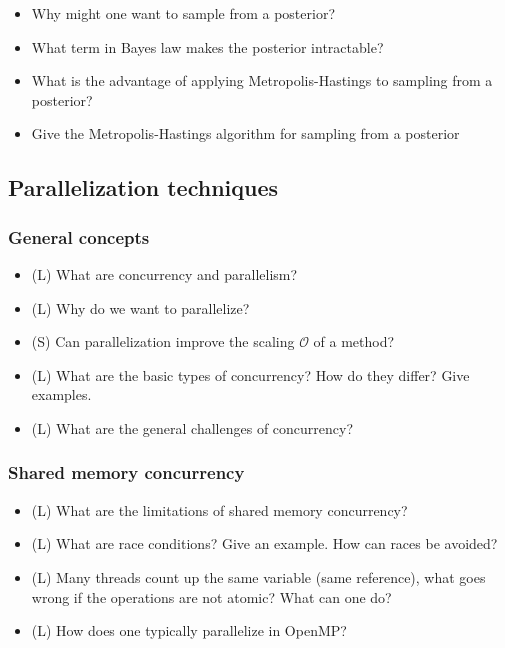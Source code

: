 \begin{itemize}
    \item Why might one want to sample from a posterior?
    \answerboxM
    \item What term in Bayes law makes the posterior intractable?
    \answerboxM
    \item What is the advantage of applying Metropolis-Hastings to sampling from a posterior?
    \answerboxM
    \item Give the Metropolis-Hastings algorithm for sampling from a posterior
    \answerboxL
\end{itemize}

\subsection*{Parallelization techniques}

\subsubsection*{General concepts}
\begin{itemize}
    \item (L) What are concurrency and parallelism?
    \answerboxS
    \item (L) Why do we want to parallelize?
    \answerboxS
    \item (S) Can parallelization improve the scaling $\mathcal{O}$ of a method?
    \answerboxS
    \item (L) What are the basic types of concurrency? How do they differ? Give examples.
    \answerboxS
    \item (L) What are the general challenges of concurrency?
    \answerboxM
\end{itemize}

\subsubsection*{Shared memory concurrency}
\begin{itemize}
    \item (L) What are the limitations of shared memory concurrency?
    \answerboxS
    \item (L) What are race conditions? Give an example. How can races be avoided?
    \answerboxM
    \item (L) Many threads count up the same variable (same reference), what goes wrong if the operations are not atomic? What can one do?
    \answerboxS
    \item (L) How does one typically parallelize in OpenMP?
    \answerboxM
\end{itemize}

